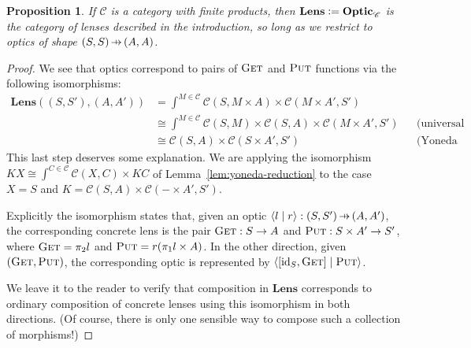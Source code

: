 \documentclass[11pt,letterpaper]{article}
\theoremstyle{plain}
\newtheorem{proposition}[theorem]{Proposition}
\theoremstyle{definition}
\newcommand{\C}{\mathscr{C}}
\newcommand{\Optic}{\mathbf{Optic}}
\newcommand{\Lens}{\mathbf{Lens}}
\newcommand{\id}{\mathrm{id}}
\newcommand{\defeq}{\mathrel{\vcentcolon=}}
\newcommand{\rep}[2]{{\ensuremath \left\langle #1 \mid #2 \right\rangle}}
\newcommand{\fget}{\textsc{Get}}
\newcommand{\fput}{\textsc{Put}}
\newcommand{\hto}{\ensuremath{\,\mathaccent\shortmid\rightarrow\,}}
\begin{document}
\begin{proposition}
If $\C$ is a category with finite products, then $\Lens \defeq \Optic_\C$ is the category of lenses described in the introduction, so long as we restrict to optics of shape $(S, S) \hto (A, A)$. 
\end{proposition}
\begin{proof}
We see that optics correspond to pairs of $\fget$ and $\fput$ functions via the following isomorphisms:
\begin{align*}
  \Lens((S, S'), (A, A'))
  &= \int^{M \in \C} \C(S, M \times A) \times \C(M \times A', S') \\
  &\cong \int^{M \in \C} \C(S, M) \times \C(S, A) \times \C(M \times A', S') && \text{(universal property of product)} \\
  &\cong \C(S, A) \times \C(S \times A', S') && \text{(Yoneda reduction)}
\end{align*}
This last step deserves some explanation. We are applying the isomorphism $KX \cong \int^{C \in \C} \C(X,C) \times KC$ of Lemma~\ref{lem:yoneda-reduction} to the case $X = S$ and $K = \C(S, A) \times \C(- \times A', S')$.

Explicitly the isomorphism states that, given an optic $\rep{l}{r} : (S, S') \hto (A, A')$, the corresponding concrete lens is the pair $\fget : S \to A$ and $\fput : S \times A' \to S'$, where $\fget = \pi_2 l$ and $\fput = r (\pi_1 l \times A)$. In the other direction, given $(\fget, \fput)$, the corresponding optic is represented by $\rep{[\id_S, \fget]}{\fput}$.

We leave it to the reader to verify that composition in $\Lens$ corresponds to ordinary composition of concrete lenses using this isomorphism in both directions. (Of course, there is only one sensible way to compose such a collection of morphisms!)
\end{proof}

\end{document}
